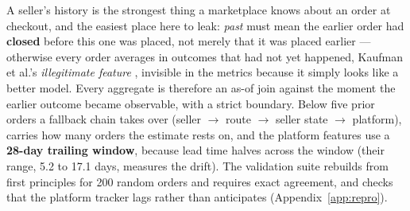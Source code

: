 A seller's history is the strongest thing a marketplace knows about an order at
checkout, and the easiest place here to leak: \emph{past} must mean the earlier
order had \textbf{closed} before this one was placed, not merely that it was
placed earlier --- otherwise every order averages in outcomes that had not yet
happened, Kaufman et al.'s \emph{illegitimate feature} \citep{kaufman2012leakage},
invisible in the metrics because it simply looks like a better model. Every
aggregate is therefore an as-of join against the moment the earlier outcome
became observable, with a strict boundary. Below five prior orders a fallback
chain takes over (seller $\rightarrow$ route $\rightarrow$ seller state
$\rightarrow$ platform),  carries how many orders the
estimate rests on, and the platform features use a \textbf{28-day trailing
window}, because lead time halves across the window (their range, 5.2 to 17.1
days, measures the drift). The validation suite rebuilds
 from first principles for 200 random orders and
requires exact agreement, and checks that the platform tracker lags rather than
anticipates (Appendix~\ref{app:repro}).
